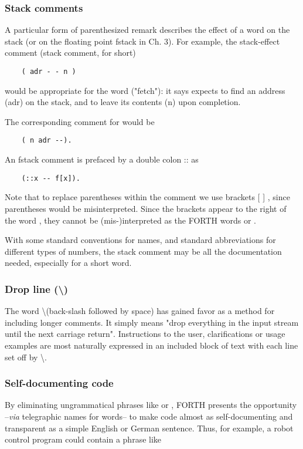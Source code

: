 \subsubsection{Stack comments}
A particular form of parenthesized remark describes the effect of a word on the stack (or on the floating point fstack in Ch. 3). For example, the stack-effect comment (stack comment, for short)

\begin{lstlisting}
    ( adr - - n )
\end{lstlisting}

would be appropriate for the word  ("fetch"): it says  expects to find an address (adr) on the stack, and to leave its contents (n) upon completion.

The corresponding comment for \bc{!} would be
\begin{lstlisting}
    ( n adr --).
\end{lstlisting}

An fstack comment is prefaced by a double colon :: as
\begin{lstlisting}
    (::x -- f[x]).
\end{lstlisting}

Note that to replace parentheses within the comment we use brackets [ ] , since parentheses would be misinterpreted. Since the brackets appear to the right of the word \bc{(} , they cannot be (mis-)interpreted as the FORTH words \bc{]} or \bc{[}.

With some standard conventions for names, and standard abbreviations for different types of numbers, the stack comment may be all the documentation needed, especially for a short word.

\subsubsection{Drop line (\textbackslash)}
The word \textbackslash (back-slash followed by space) has gained favor as a method for including longer comments. It simply means "drop everything in the input stream until the next carriage return". Instructions to the user, clarifications or usage examples are most naturally expressed in an included block of text with each line set off by \textbackslash .

\subsubsection{Self-documenting code}
By eliminating ungrammatical phrases like  or , FORTH presents the opportunity --\textit{via} telegraphic names for words-- to make code almost as self-documenting and transparent as a simple English or German sentence. Thus, for example, a robot control program could contain a phrase like

